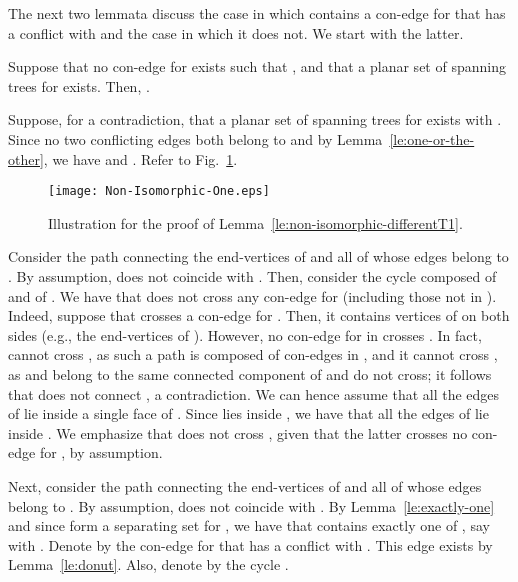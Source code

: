 \documentclass[letter,runningheads]{llncs}
\renewenvironment{proof}
{{\em Proof.\ }}{\hspace*{\fill}\par\vspace{2mm}}
\begin{document}
The next two lemmata discuss the case in which  contains a con-edge for  that has a conflict with  and the case in which it does not. We start with the latter.

\begin{lemma}[{\sc Simplification 6}] \label{le:non-isomorphic-differentT1}
Suppose that no con-edge  for  exists such that , and that a planar set  of spanning trees for  exists. Then, .
\end{lemma}

\begin{proof}
Suppose, for a contradiction, that a planar set  of spanning trees for  exists with  . Since no two conflicting edges both belong to  and by Lemma~\ref{le:one-or-the-other}, we have  and . Refer to Fig.~\ref{fig:non-isomorphic-one}.

\begin{figure}[tb]
\begin{center}
\mbox{\texttt{[image: Non-Isomorphic-One.eps]}}
\caption{Illustration for the proof of Lemma~\ref{le:non-isomorphic-differentT1}.}
\label{fig:non-isomorphic-one}
\end{center}
\end{figure}

Consider the path  connecting the end-vertices of  and all of whose edges belong to . By assumption,  does not coincide with . Then, consider the cycle  composed of  and of . We have that  does not cross any con-edge for  (including those not in ). Indeed, suppose that  crosses a con-edge  for . Then, it contains vertices of  on both sides (e.g., the end-vertices of ). However, no con-edge  for  in  crosses . In fact,  cannot cross , as such a path is composed of con-edges in , and it cannot cross , as  and  belong to the same connected component of  and do not cross; it follows that  does not connect , a contradiction. We can hence assume that all the edges of  lie inside a single face of . Since  lies inside , we have that all the edges of  lie inside . We emphasize that  does not cross , given that the latter crosses no con-edge for , by assumption.

Next, consider the path  connecting the end-vertices of  and all of whose edges belong to . By assumption,  does not coincide with . By Lemma~\ref{le:exactly-one} and since  form a separating set for , we have that  contains exactly one of , say  with . Denote by  the con-edge for  that has a conflict with . This edge exists by Lemma~\ref{le:donut}. Also, denote by  the cycle .


\end{proof}
\end{document}
